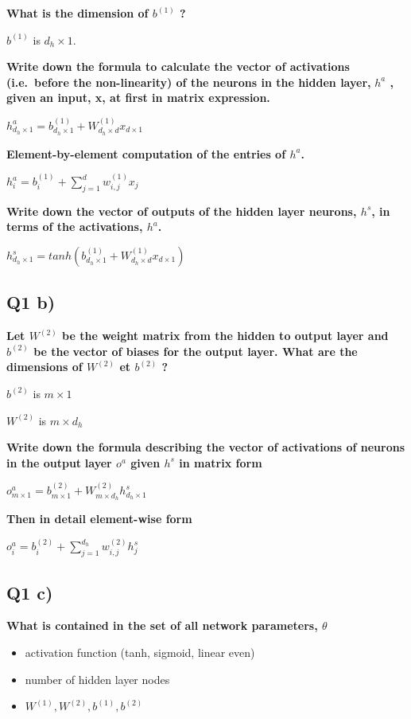 \documentclass{article}
\begin{document}
    \textbf{What is the dimension of $b^{(1)}$ ?}

$b^{(1)}$ is $d_h \times 1$.

    \textbf{Write down the formula to calculate the vector of activations}
\textbf{(i.e.~before the non-linearity) of the neurons in the hidden
layer,} \textbf{$h^a$ , given an input, x, at first in matrix
expression.}

$h^a_{d_h \times 1} = b^{(1)}_{d_h \times 1} + W^{(1)}_{d_h \times d} x_{d \times 1} $

    \textbf{Element-by-element computation of the entries of $h^a$.}

$h^a_i = b^{(1)}_i + \sum\limits_{j=1}^d w^{(1)}_{i, j}x_j$

    \textbf{Write down the vector of outputs of the hidden layer neurons,
$h^s$, in terms of the activations, $h^a$.}

$h^s_{d_h \times 1} = tanh(b^{(1)}_{d_h \times 1} + W^{(1)}_{d_h \times d} x_{d \times 1}) $

    \subsection{Q1 b)}\label{q1-b}

    \textbf{Let $W^{(2)}$ be the weight matrix from the hidden to output
layer and $b^{(2)}$ be the} \textbf{vector of biases for the output
layer. What are the dimensions of $W^{(2)}$ et $b^{(2)}$ ?}

$b^{(2)}$ is $m \times 1$

$W^{(2)}$ is $m \times d_h$

    \textbf{Write down the formula describing the vector of activations of
neurons in the output} \textbf{layer $o^a$ given $h^s$ in matrix form}

$o^a_{m \times 1} = b^{(2)}_{m \times 1} + W^{(2)}_{m \times d_h} h^s_{d_h \times 1}$

    \textbf{Then in detail element-wise form}

$o^a_i = b^{(2)}_i + \sum\limits_{j=1}^{d_h} w^{(2)}_{i, j} h^s_j$

    \subsection{Q1 c)}\label{q1-c}

    \textbf{What is contained in the set of all network parameters,
$\theta$}

\begin{itemize}
\itemsep1pt\parskip0pt
\item
  activation function (tanh, sigmoid, linear even)
\item
  number of hidden layer nodes
\item
  $W^{(1)}, W^{(2)}, b^{(1)}, b^{(2)}$
\end{itemize}
\end{document}
